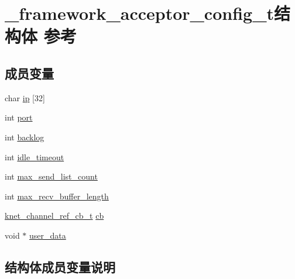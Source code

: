 \hypertarget{a00009}{}\section{\+\_\+framework\+\_\+acceptor\+\_\+config\+\_\+t结构体 参考}
\label{a00009}
\subsection*{成员变量}
\begin{DoxyCompactItemize}
\item 
char \hyperlink{a00009_a388d21431810f251c1e84a2512e3792e_a388d21431810f251c1e84a2512e3792e}{ip} \mbox{[}32\mbox{]}
\item 
int \hyperlink{a00009_a3f5aeae2ed8ad6ecb4e319b49c40d410_a3f5aeae2ed8ad6ecb4e319b49c40d410}{port}
\item 
int \hyperlink{a00009_a69e206c433c56e84a582531372fdf4ee_a69e206c433c56e84a582531372fdf4ee}{backlog}
\item 
int \hyperlink{a00009_acb4b5f93bbb16f752aa5e88075aae5ad_acb4b5f93bbb16f752aa5e88075aae5ad}{idle\+\_\+timeout}
\item 
int \hyperlink{a00009_a7e11f475833e8b10f232ce7d9e0f6589_a7e11f475833e8b10f232ce7d9e0f6589}{max\+\_\+send\+\_\+list\+\_\+count}
\item 
int \hyperlink{a00009_a74d3ca42b906826b9acc1b031b6b4510_a74d3ca42b906826b9acc1b031b6b4510}{max\+\_\+recv\+\_\+buffer\+\_\+length}
\item 
\hyperlink{a00066_a8a7d96123ef4565c6d08fe58a10476a9_a8a7d96123ef4565c6d08fe58a10476a9}{knet\+\_\+channel\+\_\+ref\+\_\+cb\+\_\+t} \hyperlink{a00009_a34e6a7a135a0c44b395f153a257f7d5c_a34e6a7a135a0c44b395f153a257f7d5c}{cb}
\item 
void $\ast$ \hyperlink{a00009_a844c508a5783d198b7c140c6f5e30706_a844c508a5783d198b7c140c6f5e30706}{user\+\_\+data}
\end{DoxyCompactItemize}


\subsection{结构体成员变量说明}
\hypertarget{a00009_a69e206c433c56e84a582531372fdf4ee_a69e206c433c56e84a582531372fdf4ee}{}
